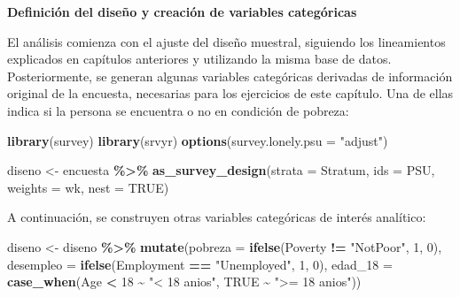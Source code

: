 \documentclass[
  spanish,
  12pt,
]{book}
\newenvironment{Shaded}{\begin{snugshade}}{\end{snugshade}}
\newcommand{\AttributeTok}[1]{\textcolor[rgb]{0.13,0.29,0.53}{#1}}
\newcommand{\ConstantTok}[1]{\textcolor[rgb]{0.56,0.35,0.01}{#1}}
\newcommand{\DecValTok}[1]{\textcolor[rgb]{0.00,0.00,0.81}{#1}}
\newcommand{\FunctionTok}[1]{\textcolor[rgb]{0.13,0.29,0.53}{\textbf{#1}}}
\newcommand{\NormalTok}[1]{#1}
\newcommand{\OtherTok}[1]{\textcolor[rgb]{0.56,0.35,0.01}{#1}}
\newcommand{\SpecialCharTok}[1]{\textcolor[rgb]{0.81,0.36,0.00}{\textbf{#1}}}
\newcommand{\StringTok}[1]{\textcolor[rgb]{0.31,0.60,0.02}{#1}}
\begin{document}
\textbf{Definición del diseño y creación de variables categóricas}

El análisis comienza con el ajuste del diseño muestral, siguiendo los lineamientos explicados en capítulos anteriores y utilizando la misma base de datos. Posteriormente, se generan algunas variables categóricas derivadas de información original de la encuesta, necesarias para los ejercicios de este capítulo. Una de ellas indica si la persona se encuentra o no en condición de pobreza:

\begin{Shaded}
\begin{Highlighting}[]
\FunctionTok{library}\NormalTok{(survey)}
\FunctionTok{library}\NormalTok{(srvyr)}
\FunctionTok{options}\NormalTok{(}\AttributeTok{survey.lonely.psu =} \StringTok{"adjust"}\NormalTok{)}

\NormalTok{diseno }\OtherTok{\textless{}{-}}\NormalTok{ encuesta }\SpecialCharTok{\%\textgreater{}\%} 
          \FunctionTok{as\_survey\_design}\NormalTok{(}\AttributeTok{strata =}\NormalTok{ Stratum,  }
                           \AttributeTok{ids =}\NormalTok{ PSU,         }
                           \AttributeTok{weights =}\NormalTok{ wk,      }
                           \AttributeTok{nest =} \ConstantTok{TRUE}\NormalTok{)}
\end{Highlighting}
\end{Shaded}

A continuación, se construyen otras variables categóricas de interés analítico:

\begin{Shaded}
\begin{Highlighting}[]
\NormalTok{diseno }\OtherTok{\textless{}{-}}\NormalTok{ diseno }\SpecialCharTok{\%\textgreater{}\%} 
          \FunctionTok{mutate}\NormalTok{(}\AttributeTok{pobreza   =} \FunctionTok{ifelse}\NormalTok{(Poverty }\SpecialCharTok{!=} \StringTok{"NotPoor"}\NormalTok{, }\DecValTok{1}\NormalTok{, }\DecValTok{0}\NormalTok{),}
                 \AttributeTok{desempleo =} \FunctionTok{ifelse}\NormalTok{(Employment }\SpecialCharTok{==} \StringTok{"Unemployed"}\NormalTok{, }\DecValTok{1}\NormalTok{, }\DecValTok{0}\NormalTok{),}
                 \AttributeTok{edad\_18   =} \FunctionTok{case\_when}\NormalTok{(Age }\SpecialCharTok{\textless{}} \DecValTok{18} \SpecialCharTok{\textasciitilde{}} \StringTok{"\textless{} 18 anios"}\NormalTok{, }
                                       \ConstantTok{TRUE} \SpecialCharTok{\textasciitilde{}} \StringTok{"\textgreater{}= 18 anios"}\NormalTok{))}
\end{Highlighting}
\end{Shaded}
\end{document}
